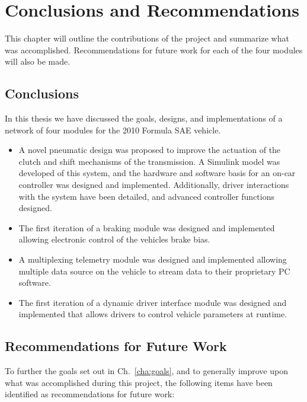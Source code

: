 
\chapter{Conclusions and Recommendations}

This chapter will outline the contributions of the project and summarize what was accomplished. Recommendations for future work for each of the four modules will also be made.

\section{Conclusions}

In this thesis we have discussed the goals, designs, and implementations of a network of four modules for the 2010 Formula SAE vehicle.

\begin{itemize}

  \item A novel pneumatic design was proposed to improve the actuation of the clutch and shift mechanisms of the transmission. A Simulink model was developed of this system, and the hardware and software basis for an on-car controller was designed and implemented. Additionally, driver interactions with the system have been detailed, and advanced controller functions designed.

  \item The first iteration of a braking module was designed and implemented allowing electronic control of the vehicles brake bias.

  \item A multiplexing telemetry module was designed and implemented allowing multiple data source on the vehicle to stream data to their proprietary PC software.

  \item The first iteration of a dynamic driver interface module was designed and implemented that allows drivers to control vehicle parameters at runtime.
  
\end{itemize}

\section{Recommendations for Future Work}

To further the goals set out in Ch.\ \ref{cha:goals}, and to generally improve upon what was accomplished during this project, the following items have been identified as recommendations for future work:


